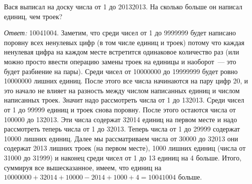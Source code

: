 \problem
Вася выписал на доску числа от 1 до 20132013.
На сколько больше он написал единиц, чем троек?

\solution
\emph{Ответ:} 10041004.
Заметим, что среди чисел от 1 до 9999999 будет написано поровну всех ненулевых
цифр (в том числе единиц и троек) потому что каждая ненулевая цифра на каждом
месте встретится одинаковое количество раз (или можно просто ввести операцию
замены троек на единицы и наоборот~--- это будет разбиение на пары).
Среди чисел от 10000000 до 19999999 будет ровно 10000000 лишних единиц.
После этого все числа начинаются на пару цифр 20, и это начало не влияет на
разность между числом написанных единиц и числом написанных троек.
Значит надо рассмотреть числа от 1 до 132013.
Среди чисел от 1 до 99999 единиц и троек снова поровну.
После этого остаются числа от 100000 до 132013.
Эти числа содержат 32014 единиц на первом месте и надо рассмотреть теперь числа
от 1 до 32013.
Теперь числа от 1 до 29999 содержат 10000 лишних единиц.
Далее мы рассматриваем числа от 30000 до 32013 они содержат 2013 лишних троек
(на первом месте), 1000 лишних единиц (числа от 31000 до 31999) и наконец среди
чисел от 1 до 13 единиц на 4 больше.
Итого, суммируя все вышесказанное, имеем, что единиц на
$10000000 + 32014 + 10000 - 2014 + 1000 + 4 = 10041004$ больше.
\endproblem
